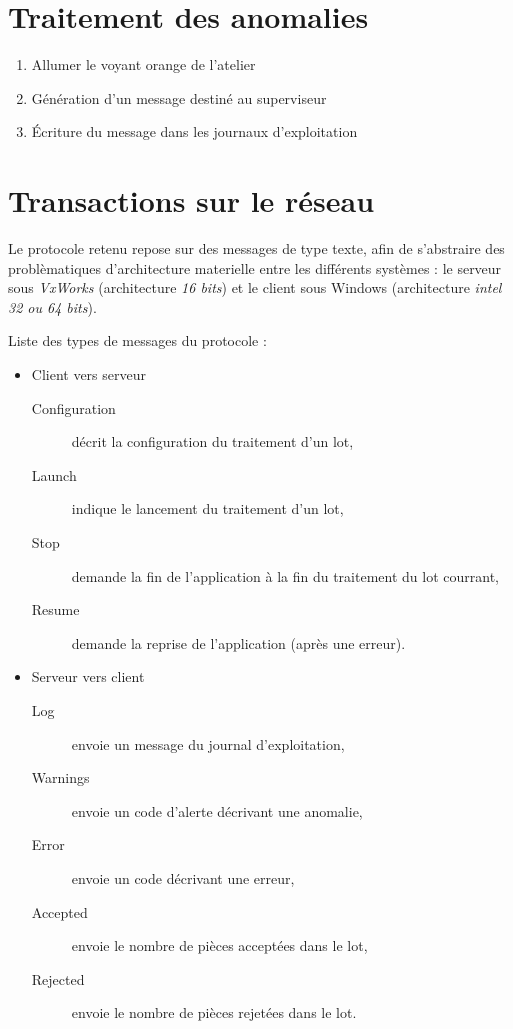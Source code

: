 \section{Traitement des anomalies}

\begin{enumerate}
	\item Allumer le voyant orange de l'atelier
	\item Génération d'un message destiné au superviseur
	\item Écriture du message dans les journaux d'exploitation
\end{enumerate}

\section{Transactions sur le réseau}
Le protocole retenu repose sur des messages de type texte, afin de s'abstraire
des problèmatiques d'architecture materielle entre les différents systèmes : le
serveur sous \textit{VxWorks} (architecture \textit{16 bits}) et le client sous
Windows (architecture \textit{intel 32 ou 64 bits}).

Liste des types de messages du protocole :\\

\begin{itemize}
	\item Client vers serveur
	\begin{description}
		\item[Configuration] décrit la configuration du traitement d'un lot,
		\item[Launch] indique le lancement du traitement d'un lot, 
		\item[Stop] demande la fin de l'application à la fin du traitement du
		lot courrant,
		\item[Resume] demande la reprise de l'application (après une erreur).
	\end{description}

	\item Serveur vers client
	\begin{description}
		\item[Log] envoie un message du journal d'exploitation,
		\item[Warnings] envoie un code d'alerte décrivant une anomalie,
		\item[Error] envoie un code décrivant une erreur,
		\item[Accepted] envoie le nombre de pièces acceptées dans le lot,
		\item[Rejected] envoie le nombre de pièces rejetées dans le lot.
	\end{description}
\end{itemize}
